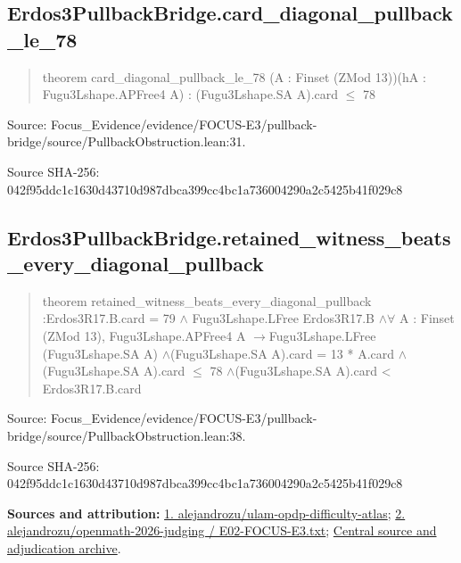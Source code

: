 \documentclass[11pt,a4paper]{article}
\begin{document}
\begin{samepage}
\subsection{Erdos3PullbackBridge.card\_diagonal\_pullback\_le\_78}
\begin{quote}\small\ttfamily theorem card\_diagonal\_pullback\_le\_78 (A : Finset (ZMod 13))\newline     (hA : Fugu3Lshape.APFree4 A) : (Fugu3Lshape.SA A).card \ensuremath{\leq} 78\end{quote}
{\small Source: Focus\_Evidence/evidence/FOCUS-E3/pullback-bridge/source/PullbackObstruction.lean:31.\par}

{\small Source SHA-256: 042f95ddc1c1630d43710d987dbca399cc4bc1a736004290a2c5425b41f029c8\par}

\end{samepage}
\begin{samepage}
\subsection{Erdos3PullbackBridge.retained\_witness\_beats\_every\_diagonal\_pullback}
\begin{quote}\small\ttfamily theorem retained\_witness\_beats\_every\_diagonal\_pullback :\newline     Erdos3R17.B.card = 79 \ensuremath{\wedge} Fugu3Lshape.LFree Erdos3R17.B \ensuremath{\wedge}\newline     \ensuremath{\forall} A : Finset (ZMod 13), Fugu3Lshape.APFree4 A \ensuremath{\to}\newline       Fugu3Lshape.LFree (Fugu3Lshape.SA A) \ensuremath{\wedge}\newline       (Fugu3Lshape.SA A).card = 13 * A.card \ensuremath{\wedge}\newline       (Fugu3Lshape.SA A).card \ensuremath{\leq} 78 \ensuremath{\wedge}\newline       (Fugu3Lshape.SA A).card < Erdos3R17.B.card\end{quote}
{\small Source: Focus\_Evidence/evidence/FOCUS-E3/pullback-bridge/source/PullbackObstruction.lean:38.\par}

{\small Source SHA-256: 042f95ddc1c1630d43710d987dbca399cc4bc1a736004290a2c5425b41f029c8\par}

{\small\textbf{Sources and attribution:} \href{https://github.com/alejandrozu/ulam-opdp-difficulty-atlas}{1. alejandrozu/ulam-opdp-difficulty-atlas}; \href{https://github.com/alejandrozu/openmath-2026-judging/blob/d0ed487f487fa7ec814ff705ab55249983fe8707/OpenMath-Judging/review/entries/E02-FOCUS-E3.txt}{2. alejandrozu/openmath-2026-judging / E02-FOCUS-E3.txt}; \href{https://github.com/alejandrozu/openmath-2026-judging}{Central source and adjudication archive}.\par}

\end{samepage}
\clearpage
\end{document}
